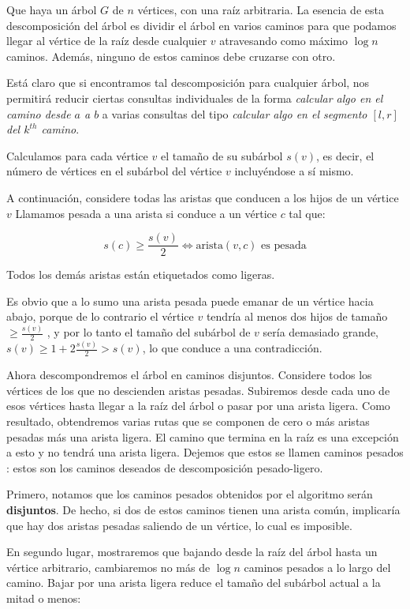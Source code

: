 Que haya un árbol $G$ de $n$ vértices, con una raíz arbitraria. La esencia de esta descomposición del 
árbol es dividir el árbol en varios caminos para que podamos llegar al vértice de la raíz desde cualquier
$v$ atravesando como máximo $\log n$ caminos. Además, ninguno de estos caminos debe cruzarse con otro.

Está claro que si encontramos tal descomposición para cualquier árbol, nos permitirá reducir ciertas 
consultas individuales de la forma \emph{calcular algo en el camino desde $a$ a $b$} a varias consultas 
del tipo \emph{calcular algo en el segmento $[l,r]$ del $k^{th}$ camino}.

Calculamos para cada vértice $v$ el tamaño de su subárbol $s(v)$, es decir, el número de vértices en el 
subárbol del vértice $v$ incluyéndose a sí mismo.

A continuación, considere todas las aristas que conducen a los hijos de un vértice $v$ Llamamos pesada a 
una arista si conduce a un vértice $c$ tal que:

$$s(c) \ge \frac{s(v)}{2} \iff \text{arista}(v,c)\text{ es pesada}$$

Todos los demás aristas están etiquetados como ligeras.

Es obvio que a lo sumo una arista pesada puede emanar de un vértice hacia abajo, porque de lo contrario 
el vértice $v$ tendría al menos dos hijos de tamaño $\ge\frac{s(v)}{2}$ , y por lo tanto el tamaño del 
subárbol de $v$ sería demasiado grande, $s(v) \ge 1 + 2 \frac{s(v)}{2} > s(v)$, lo que conduce a una 
contradicción.

Ahora descompondremos el árbol en caminos disjuntos. Considere todos los vértices de los que no 
descienden aristas pesadas. Subiremos desde cada uno de esos vértices hasta llegar a la raíz del árbol 
o pasar por una arista ligera. Como resultado, obtendremos varias rutas que se componen de cero o más 
aristas pesadas más una arista ligera. El camino que termina en la raíz es una excepción a esto y no 
tendrá una arista ligera. Dejemos que estos se llamen caminos pesados : estos son los caminos deseados 
de descomposición pesado-ligero.

Primero, notamos que los caminos pesados obtenidos por el algoritmo serán \textbf{disjuntos}. De hecho, si dos de estos caminos tienen una arista común, implicaría que hay dos aristas pesadas saliendo de un 
vértice, lo cual es imposible.

En segundo lugar, mostraremos que bajando desde la raíz del árbol hasta un vértice arbitrario, cambiaremos no más de $\log n$ caminos pesados a lo largo del camino. Bajar por una arista ligera reduce el tamaño del subárbol actual a la mitad o menos:

